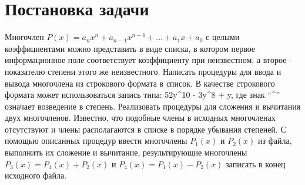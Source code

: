 \section{Постановка задачи}
\par
Многочлен $P(x) = a_nx^n + a_{n-1}x^{n-1} + \dots + a_1x + a_0$ с целыми 
коэффициентами можно
представить в виде списка, в котором первое информационное поле соответствует
коэффициенту при неизвестном, а второе - показателю степени этого же
неизвестного. Написать процедуры для ввода и вывода многочлена из строкового
формата в список. В качестве строкового формата может использоваться запись
типа: 52y\textasciicircum10 - 3y\textasciicircum8 + y, где знак 
``\textasciicircum'' означает возведение в степень. 
Реализовать
процедуры для сложения и вычитания двух многочленов. Известно, что подобные
члены в исходных многочленах отсутствуют и члены располагаются в списке в
порядке убывания степеней. С помощью описанных процедур ввести многочлены
$P_1(x)$ и $P_2(x)$ из файла, выполнить их сложение и вычитание, результирующие
многочлены $P_3(x) = P_1(x) + P_2(x)$ и $P_4(x) = P_1(x) - P_2(x)$ записать 
в конец исходного файла.
\pagebreak

